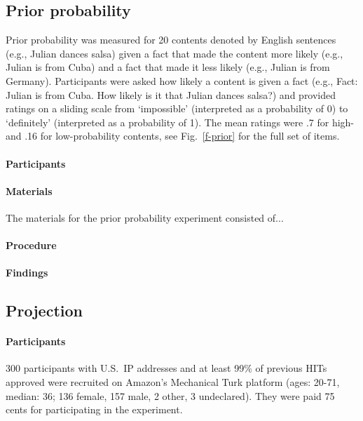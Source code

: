 \documentclass[11pt,fleqn]{article}
\newcommand{\6}{\mbox{$[\hspace*{-.6mm}[$}}
\newcommand{\9}{\mbox{$]\hspace*{-.6mm}]$}}
\begin{document}
\subsection{Prior probability}

Prior probability was measured for 20 contents denoted by English sentences (e.g., Julian dances salsa) given a fact that made the content more likely (e.g., Julian is from Cuba) and a fact that made it less likely (e.g., Julian is from Germany). Participants were asked how likely a content is given a fact (e.g., Fact: Julian is from Cuba. How likely is it that Julian dances salsa?) and provided ratings on a sliding scale from `impossible' (interpreted as a probability of 0) to `definitely' (interpreted as a probability of 1). The mean ratings were .7 for high- and .16 for low-probability contents, see Fig.~\ref{f-prior} for the full set of items.

\paragraph{Participants}

\paragraph{Materials} The materials for the prior probability experiment consisted of...

\paragraph{Procedure}

\paragraph{Findings}

\subsection{Projection}

\paragraph{Participants} 300 participants with U.S.\ IP addresses and at least 99\% of previous HITs approved were recruited on Amazon's Mechanical Turk platform (ages: 20-71, median: 36; 136 female, 157 male, 2 other, 3 undeclared). They were paid 75 cents for participating in the experiment.
\end{document}
